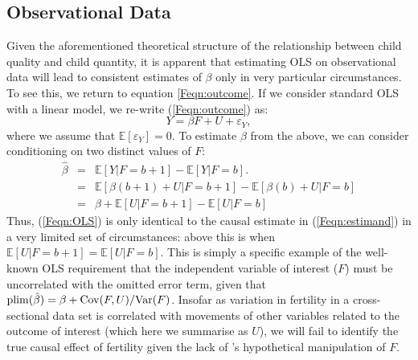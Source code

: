 \subsection{Observational Data}
Given the aforementioned theoretical structure of the relationship between 
child quality and child quantity, it is apparent that estimating OLS on 
observational data will lead to consistent estimates of $\beta$ only in very
particular circumstances. To see this, we return to equation \ref{Feqn:outcome}.
If we consider standard OLS with a linear model, we re-write 
(\ref{Feqn:outcome}) as:
\[
Y=\beta F + U + \varepsilon_Y,
\]
where we assume that $\mathbb{E}[\varepsilon_Y]=0$.  To estimate $\beta$ from
the above, we can consider conditioning on two distinct values of $F$:
\begin{eqnarray}
\hat\beta & = & \mathbb{E}[Y|F=b+1]-\mathbb{E}[Y|F=b]. \label{Feqn:OLS} \\
          & = & \mathbb{E}[\beta(b+1)+U|F=b+1] - \mathbb{E}[\beta(b)+U|F=b] \nonumber \\
          & = & \beta + \mathbb{E}[U|F=b+1] - \mathbb{E}[U|F=b] \nonumber
\end{eqnarray}
Thus, (\ref{Feqn:OLS}) is only identical to the causal estimate in 
(\ref{Feqn:estimand}) in a very limited set of circumstances: above this is when
$\mathbb{E}[U|F=b+1] = \mathbb{E}[U|F=b]$.  This is simply a specific example of 
the well-known OLS requirement that the independent variable of interest ($F$) 
must be uncorrelated with the omitted error term, given that 
$\operatorname{plim}(\hat\beta)=\beta+\mathrm{Cov}(F,U)/\mathrm{Var}(F)$.  Insofar as variation in fertility
in a cross-sectional data set is correlated with movements of other variables
related to the outcome of interest (which here we summarise as $U$), we will fail 
to identify the true causal effect of fertility given the lack of 
\citeauthor{Haavelmo1943}'s hypothetical manipulation of $F$. 

